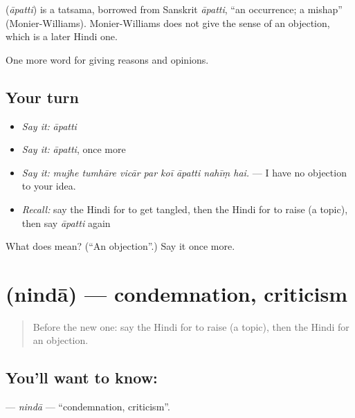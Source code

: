 \begin{cousinweb}
\textbf{} (\emph{āpatti}) is a tatsama, borrowed from Sanskrit \emph{āpatti}, \textquotedblleft{}an occurrence; a mishap\textquotedblright{} (Monier-Williams). Monier-Williams does not give the sense of an objection, which is a later Hindi one.
\end{cousinweb}

\begin{grammarlens}[title={What you've built}]
One more word for giving reasons and opinions.
\end{grammarlens}

\subsection*{Your turn}
\begin{itemize}
\raggedright
  \item \emph{Say it:} \emph{āpatti}
  \item \emph{Say it:} \emph{āpatti}, once more
  \item \emph{Say it:} \emph{mujhe tumhāre vicār par koī āpatti nahīṃ hai.} — I have no objection to your idea.
  \item \emph{Recall:} say the Hindi for to get tangled, then the Hindi for to raise (a topic), then say \emph{āpatti} again
\end{itemize}

\begin{tcolorbox}[breakable,colback=teal!4,colframe=teal!35!black,title={Before you move on}]
What does  mean? (\textquotedblleft{}An objection\textquotedblright{}.) Say it once more.
\end{tcolorbox}
\section[\texorpdfstring{\hi{निंदा} (nindā)}{निंदा (nindā)}]{ (nindā) — condemnation, criticism}

\label{lesson:HI-C360-ninda}



\begin{quote}
Before the new one: say the Hindi for to raise (a topic), then the Hindi for an objection.
\end{quote}

\subsection*{You'll want to know: }
\textbf{} — \emph{nindā} — \textquotedblleft{}condemnation, criticism\textquotedblright{}.

